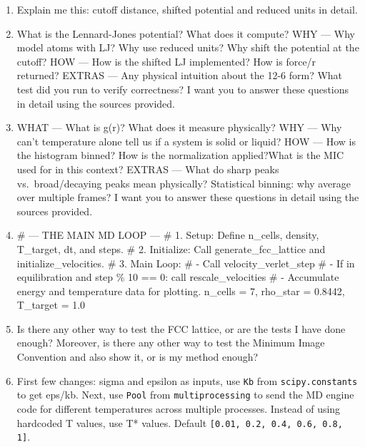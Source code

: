 \begin{enumerate}
 
\item Explain me this: cutoff distance, shifted potential and reduced units in detail.
 
\item What is the Lennard-Jones potential? What does it compute?
      WHY --- Why model atoms with LJ? Why use reduced units? Why shift the potential at
      the cutoff?
      HOW --- How is the shifted LJ implemented? How is force/r returned?
      EXTRAS --- Any physical intuition about the 12-6 form? What test did you run to
      verify correctness?
      I want you to answer these questions in detail using the sources provided.
 
\item WHAT --- What is g(r)? What does it measure physically?
      WHY --- Why can't temperature alone tell us if a system is solid or liquid?
      HOW --- How is the histogram binned? How is the normalization applied?What is the MIC used for in this context?
      EXTRAS --- What do sharp peaks vs.\ broad/decaying peaks mean physically?
                 Statistical binning: why average over multiple frames?
      I want you to answer these questions in detail using the sources provided.
 
\item \# --- THE MAIN MD LOOP ---
      \# 1. Setup: Define n\_cells, density, T\_target, dt, and steps.
      \# 2. Initialize: Call generate\_fcc\_lattice and initialize\_velocities.
      \# 3. Main Loop:
      \#    - Call velocity\_verlet\_step
      \#    - If in equilibration and step \% 10 == 0: call rescale\_velocities
      \#    - Accumulate energy and temperature data for plotting.
      n\_cells = 7,\; rho\_star = 0.8442,\; T\_target = 1.0
 
\item Is there any other way to test the FCC lattice, or are the tests I have done
      enough? Moreover, is there any other way to test the Minimum Image Convention and
      also show it, or is my method enough?
 
\item First few changes: sigma and epsilon as inputs, use \texttt{Kb} from
      \texttt{scipy.constants} to get eps/kb. Next, use \texttt{Pool} from
      \texttt{multiprocessing} to send the MD engine code for different temperatures
      across multiple processes. Instead of using hardcoded T values, use T* values.
      Default \texttt{[0.01, 0.2, 0.4, 0.6, 0.8, 1]}.


\end{enumerate}
